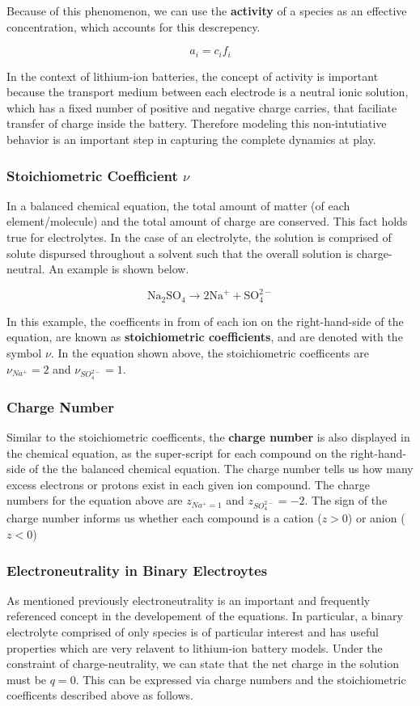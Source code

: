 \documentclass[lettersize,journal]{IEEEtran}
\begin{document}
Because of this phenomenon, we can use the \textbf{activity} of a species as an effective concentration, which accounts for this descrepency.

\[
    a_i = c_i f_i
\]

In the context of lithium-ion batteries, the concept of activity is important because the transport medium between each electrode is a neutral ionic solution, which has a fixed number of positive and negative charge carries, that faciliate transfer of charge inside the battery. Therefore modeling this non-intutiative behavior is an important step in capturing the complete dynamics at play.

\subsubsection{ Stoichiometric Coefficient $\nu$ }
In a balanced chemical equation, the total amount of matter (of each element/molecule) and the total amount of charge are conserved. This fact holds true for electrolytes. In the case of an electrolyte, the solution is comprised of solute dispursed throughout a solvent such that the overall solution is charge-neutral. An example is shown below.

\[
\mathrm{Na}_{2} \mathrm{SO}_{4} \rightarrow 2 \mathrm{Na}^{+}+\mathrm{SO}_{4}^{2-}
\]

In this example, the coefficents in from of each ion on the right-hand-side of the equation, are known as \textbf{stoichiometric coefficients}, and are denoted with the symbol $\nu$. In the equation shown above, the stoichiometric coefficents are $\nu_{Na^{+}} = 2$ and $\nu_{SO_{4}^{2-}} = 1$.

\subsubsection{ Charge Number }

Similar to the stoichiometric coefficents, the \textbf{charge number} is also displayed in the chemical equation, as the super-script for each compound on the right-hand-side of the the balanced chemical equation. The charge number tells us how many excess electrons or protons exist in each given ion compound. The charge numbers for the equation above are $z_{Na^{+} = 1}$ and $ z_{SO_{4}^{2-}} = -2 $. The sign of the charge number informs us whether each compound is a cation ($z>0$) or anion ($z < 0 $)

\subsubsection{ Electroneutrality in Binary Electroytes }
As mentioned previously electroneutrality is an important and frequently referenced concept in the developement of the equations. In particular, a binary electrolyte comprised of only species is of particular interest and has useful properties which are very relavent to lithium-ion battery models. Under the constraint of charge-neutrality, we can state that the net charge in the solution must be $q = 0$. This can be expressed via charge numbers and the stoichiometric coefficents described above as follows.
\end{document}
